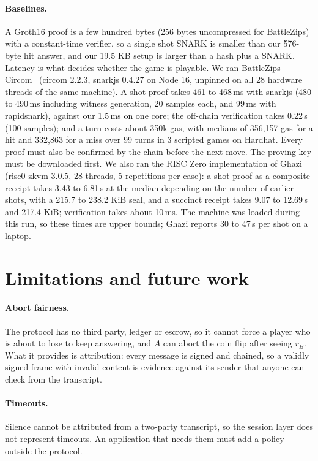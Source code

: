 \documentclass[11pt]{article}
\theoremstyle{definition}
\theoremstyle{remark}
\begin{document}
\paragraph{Baselines.}
A Groth16 proof is a few hundred bytes (256 bytes uncompressed for BattleZips) with a constant-time verifier, so a single shot SNARK is smaller than our 576-byte hit answer, and our 19.5 KB setup is larger than a hash plus a SNARK. Latency is what decides whether the game is playable. We ran BattleZips-Circom~\cite{battlezips} (circom 2.2.3, snarkjs 0.4.27 on Node 16, unpinned on all 28 hardware threads of the same machine). A shot proof takes 461 to 468\,ms with snarkjs (480 to 490\,ms including witness generation, 20 samples each, and 99\,ms with rapidsnark), against our 1.5\,ms on one core; the off-chain verification takes 0.22\,s (100 samples); and a turn costs about 350k gas, with medians of 356,157 gas for a hit and 332,863 for a miss over 99 turns in 3 scripted games on Hardhat. Every proof must also be confirmed by the chain before the next move. The proving key must be downloaded first. We also ran the RISC Zero implementation of Ghazi~\cite{ghazi} (risc0-zkvm 3.0.5, 28 threads, 5 repetitions per case): a shot proof as a composite receipt takes 3.43 to 6.81\,s at the median depending on the number of earlier shots, with a 215.7 to 238.2 KiB seal, and a succinct receipt takes 9.07 to 12.69\,s and 217.4 KiB; verification takes about 10\,ms. The machine was loaded during this run, so these times are upper bounds; Ghazi reports 30 to 47\,s per shot on a laptop.

\section{Limitations and future work}\label{sec:limitations}
\paragraph{Abort fairness.}
The protocol has no third party, ledger or escrow, so it cannot force a player who is about to lose to keep answering, and $A$ can abort the coin flip after seeing $r_B$. What it provides is attribution: every message is signed and chained, so a validly signed frame with invalid content is evidence against its sender that anyone can check from the transcript.

\paragraph{Timeouts.}
Silence cannot be attributed from a two-party transcript, so the session layer does not represent timeouts. An application that needs them must add a policy outside the protocol.
\end{document}
